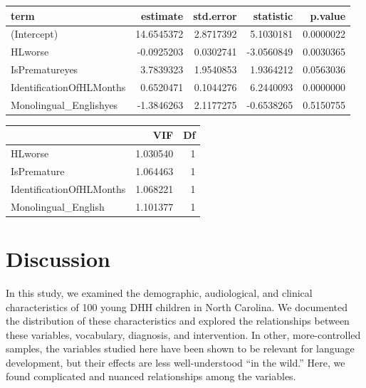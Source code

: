 \documentclass[english,man]{apa6}
\begin{document}
\begin{table}[H]
\centering
\begin{tabular}{l|r|r|r|r}
\hline
term & estimate & std.error & statistic & p.value\\
\hline
(Intercept) & 14.6545372 & 2.8717392 & 5.1030181 & 0.0000022\\
\hline
HLworse & -0.0925203 & 0.0302741 & -3.0560849 & 0.0030365\\
\hline
IsPrematureyes & 3.7839323 & 1.9540853 & 1.9364212 & 0.0563036\\
\hline
IdentificationOfHLMonths & 0.6520471 & 0.1044276 & 6.2440093 & 0.0000000\\
\hline
Monolingual\_Englishyes & -1.3846263 & 2.1177275 & -0.6538265 & 0.5150755\\
\hline
\end{tabular}
\end{table}

\begin{table}[H]
\centering
\begin{tabular}{l|r|r}
\hline
  & VIF & Df\\
\hline
HLworse & 1.030540 & 1\\
\hline
IsPremature & 1.064463 & 1\\
\hline
IdentificationOfHLMonths & 1.068221 & 1\\
\hline
Monolingual\_English & 1.101377 & 1\\
\hline
\end{tabular}
\end{table}

\hypertarget{discussion}{%
\section{Discussion}\label{discussion}}

In this study, we examined the demographic, audiological, and clinical characteristics of 100 young DHH children in North Carolina. We documented the distribution of these characteristics and explored the relationships between these variables, vocabulary, diagnosis, and intervention. In other, more-controlled samples, the variables studied here have been shown to be relevant for language development, but their effects are less well-understood \enquote{in the wild.} Here, we found complicated and nuanced relationships among the variables.
\end{document}
